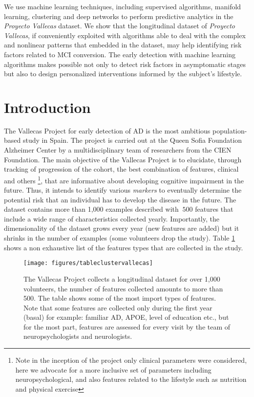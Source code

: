 \documentclass[11pt]{article}
\theoremstyle{definition}
\theoremstyle{remark}
\begin{document}
We use machine learning techniques, including supervised algorithms, manifold learning, clustering and deep networks to perform predictive analytics in the \emph{Proyecto Vallecas} dataset.
We show that the longitudinal dataset of \emph{Proyecto Vallecas}, if conveniently exploited with algorithms able to deal with the complex and nonlinear patterns that embedded in the dataset, may help identifying risk factors related to MCI conversion.
The early detection with machine learning algorithms makes possible not only to detect risk factors in asymptomatic stages but also to design  personalized interventions informed by the subject's lifestyle.

\section{Introduction}

The Vallecas Project for early detection of AD is the most ambitious population-based study in Spain. The project is carried out at the Queen Sofia Foundation Alzheimer Center by a multidisciplinary team of researchers from the CIEN Foundation. The main objective of the Vallecas Project is to elucidate, through tracking of progression of the cohort, the best combination of features, clinical and others \footnote{Note in the inception of the project only clinical parameters were considered, here we advocate for a more inclusive set of parameters including neuropsychological, and also features related to the lifestyle such as nutrition and physical exercise}, that are informative about developing 
cognitive impairment in the future. Thus, it intends to identify various \emph{markers} to eventually determine the potential risk that an  individual has to develop the disease in the future. The dataset contains more than 1,000 examples described with $~500$ features that include a wide range of characteristics collected yearly. Importantly, the dimensionality of the dataset grows every year (new features are added) but it shrinks in the number of examples (some volunteers drop the study). Table \ref{fig:tableclustervallecas} shows a non exhaustive list of the features types that are collected in the study.

\begin{figure}[h]
        \centering
        \texttt{[image: figures/tableclustervallecas]}
        \caption{The Vallecas Project collects a longitudinal dataset for over 1,000 volunteers, the number of features collected amounts to more than 500. The table shows some of the most import types of features. Note that some features are collected only during the first year (basal) for example: familiar AD, APOE, level of education etc., but for the most part, features are assessed for every visit by the team of neuropsychologists and neurologists.} \label{fig:tableclustervallecas}
\end{figure}
\end{document}

